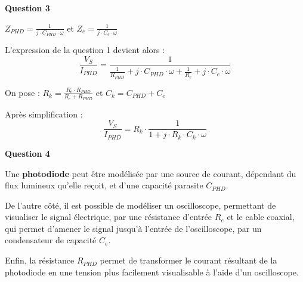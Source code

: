 \documentclass[a4paper,french]{paper}
\begin{document}
\textbf{Question 3}

$Z_{PHD} = \frac{1}{j \cdot C_{PHD} \cdot \omega}$ et $Z_{e} = \frac{1}{j \cdot C_{e} \cdot \omega}$ 

L'expression de la question 1 devient alors : $$\frac{V_S}{I_{PHD}} = \frac{1}{\frac{1}{R_{PHD}} + j \cdot C_{PHD} \cdot \omega + \frac{1}{R_{e}} + j \cdot C_{e} \cdot \omega}$$

On pose : $R_k = \frac{R_e \cdot R_{PHD}}{R_e + R_{PHD}}$ et $C_k = C_{PHD} + C_e$

Après simplification : $$\frac{V_S}{I_{PHD}} = R_k \cdot \frac{1}{1 + j \cdot R_k \cdot C_k \cdot \omega}$$

\textbf{Question 4}
	
Une \textbf{photodiode} peut être modélisée par une source de courant, dépendant du flux lumineux qu'elle reçoit, et d'une capacité parasite $C_{PHD}$.

De l'autre côté, il est possible de modéliser un oscilloscope, permettant de visualiser le signal électrique, par une résistance d'entrée $R_e$ et le cable coaxial, qui permet d'amener le signal jusqu'à l'entrée de l'oscilloscope, par un condensateur de capacité $C_e$.

Enfin, la résistance $R_{PHD}$ permet de transformer le courant résultant de la photodiode en une tension plus facilement visualisable à  l'aide d'un oscilloscope.

\end{document}
